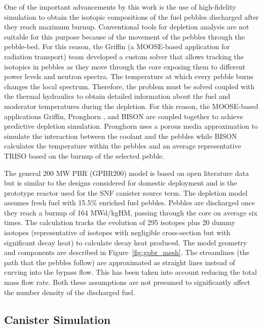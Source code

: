 \documentclass{anstrans}
\begin{document}
One of the important advancements by this work is the use of high-fidelity simulation to obtain the isotopic compositions of the fuel pebbles discharged after they reach maximum burnup.
Conventional tools for depletion analysis are not suitable for this purpose because of the movement of the pebbles through the pebble-bed.
For this reason, the Griffin (a MOOSE-based application for radiation transport) \cite{griffin} team developed a custom solver that allows tracking the isotopics in pebbles as they move through the core exposing them to different power levels and neutron spectra.
The temperature at which every pebble burns changes the local spectrum.
Therefore, the problem must be solved coupled with the thermal hydraulics to obtain detailed information about the fuel and moderator temperatures during the depletion.
For this reason, the MOOSE-based applications Griffin, Pronghorn \cite{pronghorn}, and BISON \cite{bison} are coupled together to achieve predictive depletion simulation.
Pronghorn uses a porous media approximation to simulate the interaction between the coolant and the pebbles while BISON calculates the temperature within the pebbles and an average representative TRISO based on the burnup of the selected pebble. 

The general 200 MW PBR (GPBR200) model is based on open literature data but is similar to the designs considered for domestic deployment and is the prototype reactor used for the SNF canister source term.
The depletion model assumes fresh fuel with 15.5\% enriched fuel pebbles.
Pebbles are discharged once they reach a burnup of 164 MWd/kgHM, passing through the core on average six times.
The calculation tracks the evolution of 295 isotopes plus 20 dummy isotopes (representative of isotopes with negligible cross-section but with significant decay heat) to calculate decay heat produced.
The model geometry and components are described in Figure~\ref{fig:gpbr_mesh}.
The streamlines (the path that the pebbles follow) are approximated as straight lines instead of curving into the bypass flow.
This has been taken into account reducing the total mass flow rate.
Both these assumptions are not presumed to significantly affect the number density of the discharged fuel.


\subsection{Canister Simulation}
\end{document}
